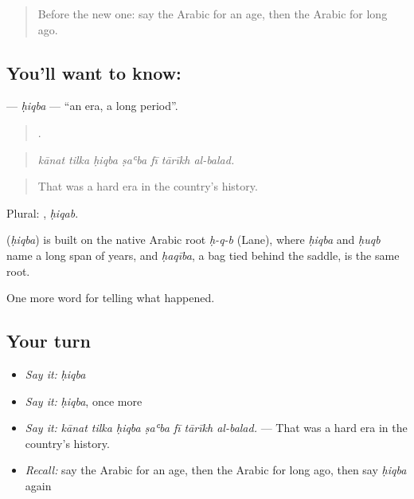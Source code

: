 \label{lesson:AR-C304-hiqba}



\begin{quote}
Before the new one: say the Arabic for an age, then the Arabic for long ago.
\end{quote}

\subsection*{You'll want to know: }
\textbf{} — \emph{ḥiqba} — \textquotedblleft{}an era, a long period\textquotedblright{}.

\begin{quote}
      .
\end{quote}

\begin{quote}
\emph{kānat tilka ḥiqba ṣaʿba fī tārīkh al-balad.}
\end{quote}

\begin{quote}
That was a hard era in the country’s history.
\end{quote}

Plural: , \emph{ḥiqab}.

\begin{cousinweb}
\textbf{} (\emph{ḥiqba}) is built on the native Arabic root \emph{ḥ-q-b} (Lane), where \emph{ḥiqba} and \emph{ḥuqb} name a long span of years, and \emph{ḥaqība}, a bag tied behind the saddle, is the same root.
\end{cousinweb}

\begin{grammarlens}[title={What you've built}]
One more word for telling what happened.
\end{grammarlens}

\subsection*{Your turn}
\begin{itemize}
\raggedright
  \item \emph{Say it:} \emph{ḥiqba}
  \item \emph{Say it:} \emph{ḥiqba}, once more
  \item \emph{Say it:} \emph{kānat tilka ḥiqba ṣaʿba fī tārīkh al-balad.} — That was a hard era in the country’s history.
  \item \emph{Recall:} say the Arabic for an age, then the Arabic for long ago, then say \emph{ḥiqba} again
\end{itemize}

